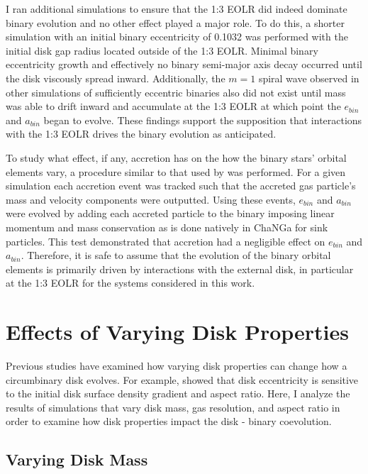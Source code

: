 I ran additional simulations to ensure that  the 1:3 EOLR did indeed dominate binary
evolution and no other effect played a major role.  To do this, a shorter simulation with an initial binary eccentricity of 0.1032 was performed
with the initial disk gap radius located outside of the 1:3 EOLR.
Minimal binary eccentricity growth and effectively no binary semi-major
axis decay occurred until the disk viscously spread inward.  Additionally, the $m = 1$ spiral wave observed in other simulations of sufficiently eccentric binaries also did not exist until mass was able to drift inward and accumulate at the 1:3 EOLR at which point the $e_{bin}$ and $a_{bin}$ began to evolve.  These findings support the supposition that interactions with the 1:3 EOLR drives the binary evolution as anticipated.

To study what effect, if any, accretion has on the how the binary stars' orbital elements vary, a procedure similar to that used by \citet{Roedig2012} 
was performed.  For a given simulation each accretion event was tracked such that the accreted gas particle's mass and velocity components were
outputted.  Using these events, $e_{bin}$ and $a_{bin}$ were evolved by adding each accreted particle to the binary imposing linear
momentum and mass conservation as is done natively in ChaNGa for sink particles.  This test demonstrated that accretion 
had a negligible effect on $e_{bin}$ and $a_{bin}$.  Therefore, it is safe to assume that the evolution of the binary orbital elements is primarily driven by interactions with the external disk, in particular at the 1:3 EOLR for the systems considered in this work.


\section{Effects of Varying Disk Properties} \label{CBDisk:sec:VaryingDiscProps}

Previous studies have examined how varying disk properties can change
how a circumbinary disk evolves.  For example, \citet{Lines2015} showed
that disk eccentricity is sensitive to the initial disk surface
density gradient and aspect ratio.  Here, I analyze the results of simulations that vary disk mass, gas resolution, and
aspect ratio in order to examine how disk properties impact the disk - binary coevolution.


\subsection{Varying Disk Mass} \label{CBDisk:sec:VaryingDiscMass}

